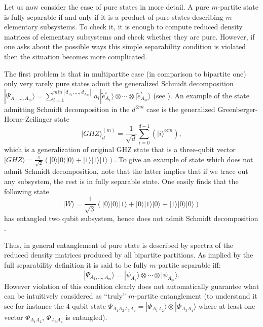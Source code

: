 \documentclass[twocolumn,aps,rmp]{revtex4}
\begin{document}
Let us now consider the case of pure states in more detail. A pure
$m$-partite state is fully separable if and only if it is a product of
pure states describing $m$ elementary subsystems. To check it, it is
enough to compute reduced density matrices of elementary subsystems
and check whether they are pure. However, if one asks about the
possible ways this simple separability condition is violated then the
situation becomes more complicated.

The first problem is that in multipartite case (in comparison to
bipartite one) only very rarely pure states admit the generalized
Schmidt decomposition $|\Psi_{A_{1},\ldots,A_{m}}\rangle =
\sum_{i=1}^{min[d_{A_1},\ldots,d_{A_{m}}]} a_{i} |\tilde{e}_{A_{1}}^{i}
\rangle\otimes \cdots \otimes |\tilde{e}_{A_{m}}^{i}\rangle $ (see
\cite{PeresSchmidt,Thaplyial}). An example of the state admitting
Schmidt decomposition in the $d^{\otimes m}$ case is the generalized
Greenberger-Horne-Zeilinger state
\begin{equation}
|GHZ\rangle^{(m)}_{d}=\frac{1}{\sqrt{d}}
\sum_{i=0}^{d-1}(|i\rangle^{\otimes m}), \label{GHZ}
\end{equation}
which is a generalization of original GHZ state \cite{GHZk} that is
a three-qubit vector $|GHZ\rangle=
\frac{1}{\sqrt{2}}(|0\rangle|0\rangle|0\rangle+|1\rangle|1\rangle|1\rangle)$.
To give an example of state which does not admit Schmidt
decomposition, note that the latter implies that if we trace out any
subsystem, the rest is in fully separable state. One easily finds
that the following state
\begin{equation}
|W\rangle=
\frac{1}{\sqrt{3}}(|0\rangle|0\rangle|1\rangle+|0\rangle|1\rangle|0\rangle+
|1\rangle|0\rangle|0\rangle)
\end{equation}
has entangled two qubit subsystem, hence does not admit Schmidt
decomposition \cite{DurVC00-wstate}.

Thus, in general entanglement of pure state is described by spectra of
the reduced density matrices produced by all bipartite partitions. As
implied by the full separability definition it is said to be fully
$m$-partite separable iff:
\begin{equation}
|\Psi_{A_{1},\ldots,A_{m}}\rangle =|\psi_{A_{1}}\rangle \otimes \cdots
\otimes |\psi_{A_{m}} \rangle. \label{ProductPure}
\end{equation}
However violation of this condition clearly does not automatically
guarantee what can be intuitively considered as ``truly'' $m$-partite
entanglement (to understand it see for instance the $4$-qubit state
$\Psi_{A_{1}A_{2}A_{3}A_{4}}=|\Phi_{A_{1}A_{2}}\rangle \otimes
|\Phi_{A_{3}A_{4}}\rangle $ where at least one vector
$\Phi_{A_{1}A_{2}}$, $\Phi_{A_{3}A_{4}}$ is entangled).
\end{document}
